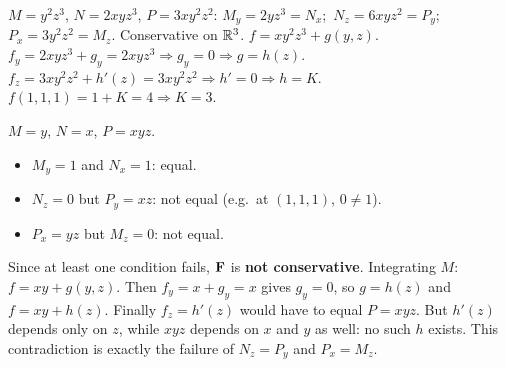  $M=y^2z^3$, $N=2xyz^3$, $P=3xy^2z^2$:
$M_y=2yz^3=N_x$;\ $N_z=6xyz^2=P_y$;\ $P_x=3y^2z^2=M_z$. Conservative on $\mathbb{R}^3$.
 $f=xy^2z^3+g(y,z)$.
 $f_y=2xyz^3+g_y=2xyz^3\Rightarrow g_y=0\Rightarrow g=h(z)$.
 $f_z=3xy^2z^2+h'(z)=3xy^2z^2\Rightarrow h'=0\Rightarrow h=K$.
 $f(1,1,1)=1+K=4\Rightarrow K=3$.

 $M=y$, $N=x$, $P=xyz$.
\begin{itemize}
\item $M_y=1$ and $N_x=1$: equal.
\item $N_z=0$ but $P_y=xz$: not equal (e.g.\ at $(1,1,1)$, $0\neq1$).
\item $P_x=yz$ but $M_z=0$: not equal.
\end{itemize}
Since at least one condition fails, $\mathbf{F}$ is \textbf{not conservative}.
 Integrating $M$: $f=xy+g(y,z)$. Then
$f_y=x+g_y=x$ gives $g_y=0$, so $g=h(z)$ and $f=xy+h(z)$. Finally $f_z=h'(z)$ would have to
equal $P=xyz$. But $h'(z)$ depends only on $z$, while $xyz$ depends on $x$ and $y$ as well:
no such $h$ exists. This contradiction is exactly the failure of $N_z=P_y$ and $P_x=M_z$.

